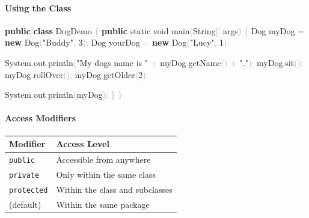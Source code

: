 \documentclass[
  justified,
  openright,
]{tufte-book}
\let\subsection\paragraph
\let\paragraph\paragraph
\newcommand{\KeywordTok}[1]{\textcolor{CodeKeyword}{\textbf{#1}}}  %
\newcommand{\StringTok}[1]{\textcolor{CodeString}{#1}}              %
\newcommand{\CodeNumTok}[1]{\textcolor{CodeNumber}{#1}}             %
\newcommand{\CodeFuncTok}[1]{\textcolor{CodeKeyword}{#1}}           %
\newcommand{\CodeTypeTok}[1]{\textcolor{CodeType}{#1}}              %
\newcommand{\OperatorTok}[1]{\textcolor{DarkGray}{#1}}              %
\newenvironment{Shaded}{%
  \begin{mdframed}[style=TufteCode]%
}{%
  \end{mdframed}%
}
\let\subsection\paragraph
\let\paragraph\paragraph
\begin{document}
\subsection{Using the Class}\label{using-the-class}

\begin{Shaded}
\begin{Highlighting}[]
\KeywordTok{public} \KeywordTok{class} DogDemo \OperatorTok{\{}
    \KeywordTok{public} \CodeTypeTok{static} \CodeTypeTok{void} \CodeFuncTok{main}\OperatorTok{(}String\OperatorTok{[]} args\OperatorTok{)} \OperatorTok{\{}
        Dog myDog \OperatorTok{=} \KeywordTok{new} \CodeFuncTok{Dog}\OperatorTok{(}\StringTok{"Buddy"}\OperatorTok{,} \CodeNumTok{3}\OperatorTok{);}
        Dog yourDog \OperatorTok{=} \KeywordTok{new} \CodeFuncTok{Dog}\OperatorTok{(}\StringTok{"Lucy"}\OperatorTok{,} \CodeNumTok{1}\OperatorTok{);}
 
        System\OperatorTok{.}\CodeFuncTok{out}\OperatorTok{.}\CodeFuncTok{println}\OperatorTok{(}\StringTok{"My dog\textquotesingle{}s name is "} \OperatorTok{+} myDog\OperatorTok{.}\CodeFuncTok{getName}\OperatorTok{()} \OperatorTok{+} \StringTok{"."}\OperatorTok{);}
        myDog\OperatorTok{.}\CodeFuncTok{sit}\OperatorTok{();}
        myDog\OperatorTok{.}\CodeFuncTok{rollOver}\OperatorTok{();}
        myDog\OperatorTok{.}\CodeFuncTok{getOlder}\OperatorTok{(}\CodeNumTok{2}\OperatorTok{);}
 
        System\OperatorTok{.}\CodeFuncTok{out}\OperatorTok{.}\CodeFuncTok{println}\OperatorTok{(}myDog\OperatorTok{);}
    \OperatorTok{\}}
\OperatorTok{\}}
\end{Highlighting}
\end{Shaded}

\subsection{Access Modifiers}\label{access-modifiers}

\begin{fullwidth}{\def\LTcaptype{none} %
\begin{longtable}[]{@{}ll@{}}
\toprule\noalign{}
Modifier & Access Level \\
\midrule\noalign{}
\endhead
\bottomrule\noalign{}
\endlastfoot
\texttt{public} & Accessible from anywhere \\
\texttt{private} & Only within the same class \\
\texttt{protected} & Within the class and subclasses \\
(default) & Within the same package \\
\end{longtable}
}
\end{fullwidth}
\end{document}
